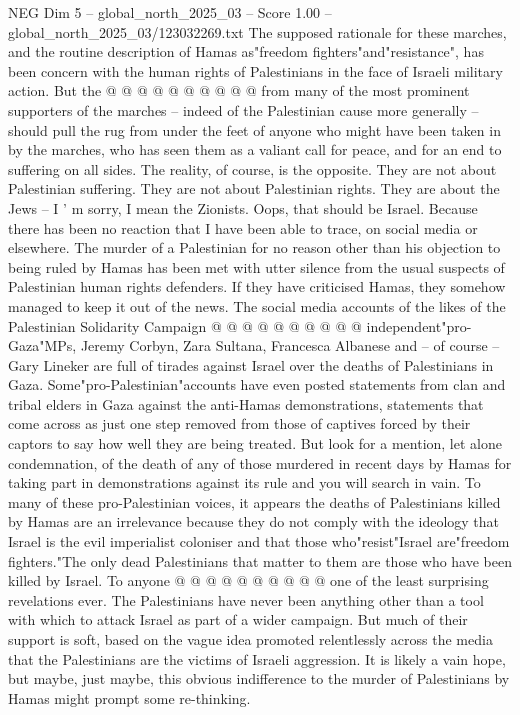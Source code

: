 \begin{textsample}{NEG Dim 5 – global\_north\_2025\_03 – Score 1.00 – global\_north\_2025\_03/123032269.txt}
The supposed rationale for these marches, and the routine description of Hamas as"freedom fighters"and"resistance", has been concern with the human rights of Palestinians in the face of Israeli military action.
But the @ @ @ @ @ @ @ @ @ @ from many of the most prominent supporters of the marches -- indeed of the Palestinian cause more generally -- should pull the rug from under the feet of anyone who might have been taken in by the marches, who has seen them as a valiant call for peace, and for an end to suffering on all sides.
The reality, of course, is the opposite.
They are not about Palestinian suffering.
They are not about Palestinian rights.
They are about the Jews -- I ' m sorry, I mean the Zionists.
Oops, that should be Israel.
Because there has been no reaction that I have been able to trace, on social media or elsewhere.
The murder of a Palestinian for no reason other than his objection to being ruled by Hamas has been met with utter silence from the usual suspects of Palestinian human rights defenders.
If they have criticised Hamas, they somehow managed to keep it out of the news.
The social media accounts of the likes of the Palestinian Solidarity Campaign @ @ @ @ @ @ @ @ @ @ independent"pro-Gaza"MPs, Jeremy Corbyn, Zara Sultana, Francesca Albanese and -- of course -- Gary Lineker are full of tirades against Israel over the deaths of Palestinians in Gaza.
Some"pro-Palestinian"accounts have even posted statements from clan and tribal elders in Gaza against the anti-Hamas demonstrations, statements that come across as just one step removed from those of captives forced by their captors to say how well they are being treated.
But look for a mention, let alone condemnation, of the death of any of those murdered in recent days by Hamas for taking part in demonstrations against its rule and you will search in vain.
To many of these pro-Palestinian voices, it appears the deaths of Palestinians killed by Hamas are an irrelevance because they do not comply with the ideology that Israel is the evil imperialist coloniser and that those who"resist"Israel are"freedom fighters."The only dead Palestinians that matter to them are those who have been killed by Israel.
To anyone @ @ @ @ @ @ @ @ @ @ one of the least surprising revelations ever.
The Palestinians have never been anything other than a tool with which to attack Israel as part of a wider campaign.
But much of their support is soft, based on the vague idea promoted relentlessly across the media that the Palestinians are the victims of Israeli aggression.
It is likely a vain hope, but maybe, just maybe, this obvious indifference to the murder of Palestinians by Hamas might prompt some re-thinking.

\end{textsample}
